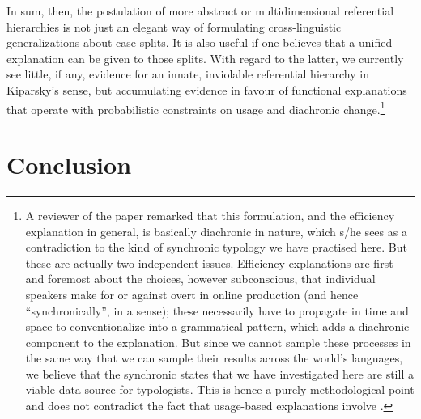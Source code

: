 \documentclass[output=paper]{langscibook}
\begin{document}
\largerpage
In sum, then, the postulation of more abstract or multidimensional referential hierarchies is not just an elegant way of formulating cross-linguistic generalizations about case splits. It is also useful if one believes that a unified explanation can be given to those splits. With regard to the latter, we currently see little, if any, evidence for an innate, inviolable referential hierarchy in Kiparsky’s sense, but accumulating evidence in favour of functional explanations that operate with probabilistic constraints on usage and diachronic change.\footnote{A reviewer of the paper remarked that this formulation, and the efficiency explanation in general, is basically diachronic in nature, which s/he sees as a contradiction to the kind of synchronic typology we have practised here. But these are actually two independent issues. Efficiency explanations are first and foremost about the choices, however subconscious, that individual speakers make for or against overt  in online production (and hence “synchronically”, in a sense); these necessarily have to propagate in time and space to conventionalize into a grammatical pattern, which adds a diachronic component to the explanation. But since we cannot sample these processes in the same way that we can sample their results across the world’s languages, we believe that the synchronic states that we have investigated here are still a viable data source for typologists. This is hence a purely methodological point and does not contradict the fact that usage-based explanations involve .} 

\section{Conclusion}
\label{18-sc-sec:5}
\end{document}
